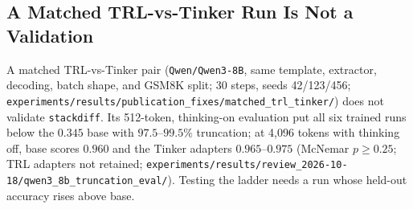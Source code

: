 \subsection{A Matched TRL-vs-Tinker Run Is Not a Validation}
\label{sec:p6s-claimc-slot}
A matched TRL-vs-Tinker pair (\texttt{Qwen/Qwen3-8B}, same template, extractor,
decoding, batch shape, and GSM8K split; 30 steps, seeds 42/123/456;
\texttt{experiments/results/publication\_fixes/matched\_trl\_tinker/}) does
not validate \texttt{stackdiff}. Its 512-token, thinking-on evaluation put all
six trained runs below the $0.345$ base with $97.5$--$99.5\%$ truncation; at
4{,}096 tokens with thinking off, base scores $0.960$ and the Tinker adapters
$0.965$--$0.975$ (McNemar $p\ge0.25$; TRL adapters not retained;
\nolinkurl{experiments/results/review_2026-10-18/qwen3_8b_truncation_eval/}).
Testing the ladder needs a run whose held-out accuracy rises above base.
\endinput %
The registry contains two stacks claiming the label \texttt{dapo}: the open
Colab trainer arm and the managed-runtime arm. Diffing them:

\begin{lstlisting}[basicstyle=\ttfamily\scriptsize, frame=single,
  breaklines=true, caption={\texttt{stackdiff colab-open_dapo_e3
  tinker_dapo_qwen3.5-4b_gsm8k} (abridged to 10 of 37 output lines). Regenerate with \texttt{python3 registry/query.py stackdiff}.},
  label={lst:p6-stackdiff}]
stackdiff colab-open_dapo_e3 vs tinker_dapo_qwen3.5-4b_gsm8k
  shared claimed label: 'dapo'
  [R5] checkpoint.id: 'Qwen/Qwen2.5-0.5B-Instruct' -> 'Qwen/Qwen3.5-4B'
  [R5] data.dataset: 'synthetic a+b, a,b in [11,60]' -> 'openai/gsm8k:main'
  [R5] eval.metric: 'greedy held-out accuracy delta (post - pre)' -> 'mean sampled train reward over last 10 steps'
  [R4] loss.objective: 'ppo-clip on sequence log-prob ratio, summed over sequences' -> 'reinforce: -A_i * sum_t logp, mean over sequences'
  [R4] loss.clip: 'ratio[0.8,1.28]' -> 'advantage[-2,3]'
  [R4] loss.dynamic_sampling: 'resample zero-variance groups up to 2 retries, then drop' -> False
verdict: R5 outcome-critical differences (checkpoint, reward, prompt/chat template, dataset, eval protocol, execution mode)
coverage: 0.87 of compared fields known on both sides; 7 unknown (max hidden severity R5)
\end{lstlisting}

